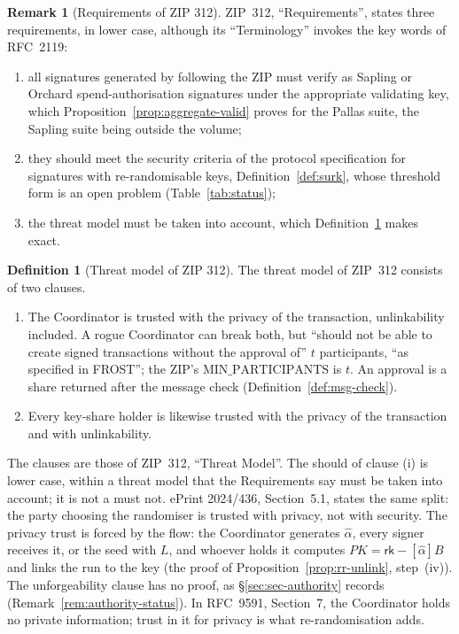 \documentclass[11pt,a4paper]{article}
\theoremstyle{definition}
\newtheorem{definition}[theorem]{Definition}
\newtheorem{remark}[theorem]{Remark}
\newcommand{\rk}{\mathsf{rk}}
\begin{document}
\begin{remark}[Requirements of ZIP 312]\label{rem:zip312-req}
ZIP~312, ``Requirements'', states three requirements, in lower case,
although its ``Terminology'' invokes the key words of RFC~2119:
\begin{enumerate}
\item[(a)] all signatures generated by following the ZIP must verify as
  Sapling or Orchard spend-authorisation signatures under the appropriate
  validating key, which Proposition~\ref{prop:aggregate-valid} proves for
  the Pallas suite, the Sapling suite being outside the volume;
\item[(b)] they should meet the security criteria of the protocol
  specification for signatures with re-randomisable keys,
  Definition~\ref{def:surk}, whose threshold form is an open problem
  (Table~\ref{tab:status});
\item[(c)] the threat model must be taken into account, which
  Definition~\ref{def:rr-threat} makes exact.
\end{enumerate}
\end{remark}

\begin{definition}[Threat model of ZIP 312]\label{def:rr-threat}
The threat model of ZIP~312 consists of two clauses.
\begin{enumerate}
\item[(i)] The Coordinator is trusted with the privacy of the transaction,
  unlinkability included. A rogue Coordinator can break both, but ``should
  not be able to create signed transactions without the approval of''
  \(t\) participants, ``as specified in FROST''; the ZIP's
  \(\mathrm{MIN\_PARTICIPANTS}\) is \(t\). An approval is a share returned
  after the message check (Definition~\ref{def:msg-check}).
\item[(ii)] Every key-share holder is likewise trusted with the privacy of
  the transaction and with unlinkability.
\end{enumerate}
\end{definition}

The clauses are those of ZIP~312, ``Threat Model''. The should of clause
(i) is lower case, within a threat model that the Requirements say must be
taken into account; it is not a must not. ePrint 2024/436, Section~5.1,
states the same split: the party choosing the randomiser is trusted with
privacy, not with security. The privacy trust is forced by the flow: the
Coordinator generates \(\hat{\alpha}\), every signer receives it, or the seed
with \(L\), and whoever holds it computes \(\mathit{PK} = \rk -
[\hat{\alpha}]B\) and links the run to the key (the proof of
Proposition~\ref{prop:rr-unlink}, step~(iv)). The unforgeability clause has no
proof, as \S\ref{sec:sec-authority} records (Remark~\ref{rem:authority-status}).
In RFC~9591, Section~7, the
Coordinator holds no private information; trust in it for privacy is what
re-randomisation adds.
\end{document}
